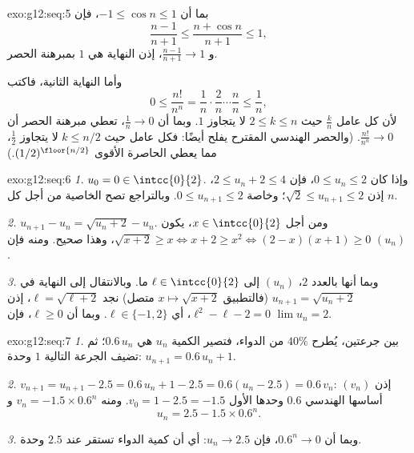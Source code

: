 \begin{solution}{exo:g12:seq:5}
بما أن $-1 \leq \cos n \leq 1$، فإن
\[
\frac{n-1}{n+1} \leq \frac{n + \cos n}{n+1} \leq 1,
\]
و $\frac{n-1}{n+1} \to 1$، إذن النهاية هي $1$ بمبرهنة الحصر.

وأما النهاية الثانية، فاكتب
\[
0 \leq \frac{n!}{n^n}
= \frac{1}{n}\cdot\frac{2}{n}\cdots\frac{n}{n}
\leq \frac{1}{n},
\]
لأن كل عامل $\frac{k}{n}$ حيث $2 \leq k \leq n$ لا يتجاوز $1$.
وبما أن $\frac1n \to 0$، تعطي مبرهنة الحصر أن $\frac{n!}{n^n} \to 0$. (والحصر
الهندسي المقترح يفلح أيضًا: فكل عامل حيث $k \leq n/2$ لا يتجاوز
$\frac12$، مما يعطي الحاصرة الأقوى $(1/2)^{\floor{n/2}}$.)
\end{solution}

\begin{solution}{exo:g12:seq:6}
\emph{1.} $u_0 = 0 \in \intcc{0}{2}$. وإذا كان $0 \leq u_n \leq 2$، فإن
$2 \leq u_n + 2 \leq 4$، إذن $\sqrt{2} \leq u_{n+1} \leq 2$؛ وخاصة
$0 \leq u_{n+1} \leq 2$. وبالتراجع تصح الخاصية من أجل كل $n$.

\emph{2.} $u_{n+1} - u_n = \sqrt{u_n + 2} - u_n$. ومن أجل $x \in \intcc{0}{2}$، يكون
$\sqrt{x+2} \geq x \iff x + 2 \geq x^2 \iff (2-x)(x+1) \geq 0$، وهذا صحيح.
ومنه فإن $(u_n)$ .

\emph{3.} وبما أنها   بالعدد $2$،  $(u_n)$ إلى
$\ell \in \intcc{0}{2}$ ما. وبالانتقال إلى النهاية في $u_{n+1} = \sqrt{u_n + 2}$
(فالتطبيق $x \mapsto \sqrt{x+2}$ متصل) نجد $\ell = \sqrt{\ell + 2}$،
إذن $\ell^2 - \ell - 2 = 0$، أي $\ell \in \{-1, 2\}$. وبما أن $\ell \geq 0$،
فإن $\lim u_n = 2$.
\end{solution}

\begin{solution}{exo:g12:seq:7}
\emph{1.} بين جرعتين، يُطرح $40\%$ من الدواء، فتصير
الكمية $u_n$ هي $0.6\,u_n$؛ ثم تضيف الجرعة التالية $1$ وحدة:
$u_{n+1} = 0.6\,u_n + 1$.

\emph{2.} $v_{n+1} = u_{n+1} - 2.5 = 0.6\,u_n + 1 - 2.5 = 0.6(u_n - 2.5)
= 0.6\,v_n$: إذن $(v_n)$  أساسها الهندسي $0.6$ وحدها الأول
$v_0 = 1 - 2.5 = -1.5$. ومنه $v_n = -1.5 \times 0.6^n$ و
\[
u_n = 2.5 - 1.5 \times 0.6^n .
\]

\emph{3.} وبما أن $0.6^n \to 0$، فإن $u_n \to 2.5$: أي أن كمية الدواء تستقر
عند $2.5$ وحدة.
\end{solution}

